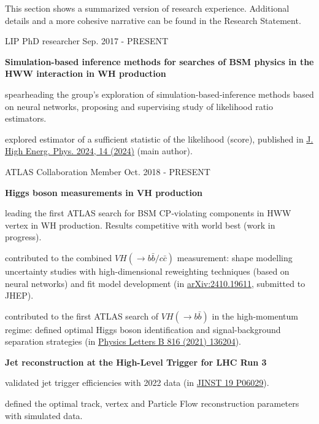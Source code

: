 
This section shows a summarized version of research experience. Additional details and a more cohesive narrative can be found in the Research Statement.

\begin{cventries}

    \cventry
    {LIP}
    {PhD researcher}
    {}
    {Sep. 2017 - PRESENT}
    {
        \textbf{Simulation-based inference methods for searches of BSM physics in the HWW interaction in WH production}\vspace{12pt}
        \begin{cvitems}      
            \item {spearheading the group's exploration of simulation‑based‑inference methods based on neural networks, proposing and supervising study of likelihood ratio estimators.}
            \item {explored estimator of a sufficient statistic of the likelihood (score), published in \href{https://doi.org/10.1007/JHEP04(2024)014}{J. High Energ. Phys. 2024, 14 (2024)} (main author).}
        \end{cvitems}
    }

    \cventry
    {ATLAS Collaboration}
    {Member}
    {}
    {Oct. 2018 - PRESENT}
    {
        \textbf{Higgs boson measurements in VH production}\vspace{14pt}
        \begin{cvitems}
            \item {leading the first ATLAS search for BSM CP‑violating components in HWW vertex in WH production. Results competitive with world best (work in progress).}
            \item {contributed to the combined $VH(\to b\bar{b}/c\bar{c})$ measurement: shape modelling uncertainty studies with high-dimensional reweighting techniques (based on neural networks) and fit model development (in \href{https://arxiv.org/abs/2410.19611}{arXiv:2410.19611}, submitted to JHEP).}
            \item {contributed to the first ATLAS search of $VH(\to b\bar{b})$ in the high-momentum regime: defined optimal Higgs boson identification and signal-background separation strategies (in \href{https://doi.org/10.1016/j.physletb.2021.136204}{Physics Letters B 816 (2021) 136204}).}
        \end{cvitems}\vspace{19pt}
        \textbf{Jet reconstruction at the High-Level Trigger for LHC Run 3}\vspace{14pt}
        \begin{cvitems}
            \item {validated jet trigger efficiencies with 2022 data (in \href{https://doi.org/10.1088/1748-0221/19/06/P06029}{JINST 19 P06029}).}
            \item {defined the optimal track, vertex and Particle Flow reconstruction parameters with simulated data.}
        \end{cvitems}
    }

\end{cventries}